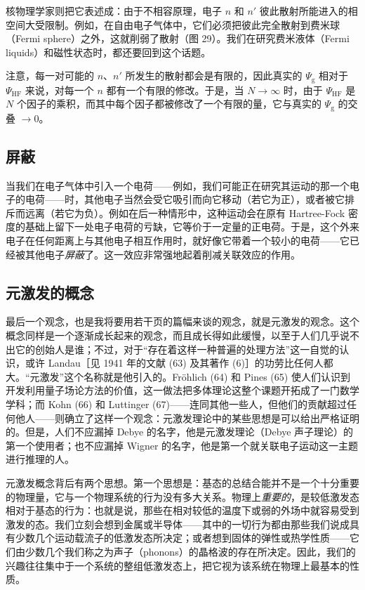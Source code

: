 核物理学家则把它表述成：由于不相容原理，电子 $n$ 和 $n'$ 彼此散射所能进入的相空间大受限制。例如，在自由电子气体中，它们必须把彼此完全散射到费米球（Fermi sphere）之外，这就削弱了散射（图 29）。我们在研究费米液体（Fermi liquids）和磁性状态时，都还要回到这个话题。

注意，每一对可能的 $n$、$n'$ 所发生的散射都会是有限的，因此真实的 $\Psi_{\mathrm{g}}$ 相对于 $\Psi_{\mathrm{HF}}$ 来说，对每一个 $n$ 都有一个有限的修改。于是，当 $N\to\infty$ 时，由于 $\Psi_{\mathrm{HF}}$ 是 $N$ 个因子的乘积，而其中每个因子都被修改了一个有限的量，它与真实的 $\Psi_{\mathrm{g}}$ 的交叠 $\to 0$。


\subsection{屏蔽}

当我们在电子气体中引入一个电荷——例如，我们可能正在研究其运动的那一个电子的电荷——时，其他电子当然会受它吸引而向它移动（若它为正），或者被它排斥而远离（若它为负）。例如在后一种情形中，这种运动会在原有 Hartree-Fock 密度的基础上留下一处电子电荷的亏缺，它等价于一定量的正电荷。于是，这个外来电子在任何距离上与其他电子相互作用时，就好像它带着一个较小的电荷——它已经被其他电子\emph{屏蔽}了。这一效应非常强地起着削减关联效应的作用。

\subsection{元激发的概念}

最后一个观念，也是我将要用若干页的篇幅来谈的观念，就是元激发的观念。这个概念同样是一个逐渐成长起来的观念，而且成长得如此缓慢，以至于人们几乎说不出它的创始人是谁；不过，对于“存在着这样一种普遍的处理方法”这一自觉的认识，或许 Landau［见 1941 年的文献 (63) 及其著作 (6)］的功劳比任何人都大。“元激发”这个名称就是他引入的。Fröhlich (64) 和 Pines (65) 使人们认识到开发利用量子场论方法的价值，这一做法把多体理论这整个课题开拓成了一门数学学科；而 Kohn (66) 和 Luttinger (67)——连同其他一些人，但他们的贡献超过任何他人——则确立了这样一个观念：元激发理论中的某些思想是可以给出严格证明的。但是，人们不应漏掉 Debye 的名字，他是元激发理论（Debye 声子理论）的第一个使用者；也不应漏掉 Wigner 的名字，他是第一个就关联电子运动这一主题进行推理的人。

元激发概念背后有两个思想。第一个思想是：基态的总结合能并不是一个十分重要的物理量，它与一个物理系统的行为没有多大关系。物理上\emph{重要的}，是较低激发态相对于基态的行为：也就是说，那些在相对较低的温度下或弱的外场中就容易受到激发的态。我们立刻会想到金属或半导体——其中的一切行为都由那些我们说成具有少数几个运动载流子的低激发态所决定；或者想到固体的弹性或热学性质——它们由少数几个我们称之为声子（phonons）的晶格波的存在所决定。因此，我们的兴趣往往集中于一个系统的整组低激发态上，把它视为该系统在物理上最基本的性质。

